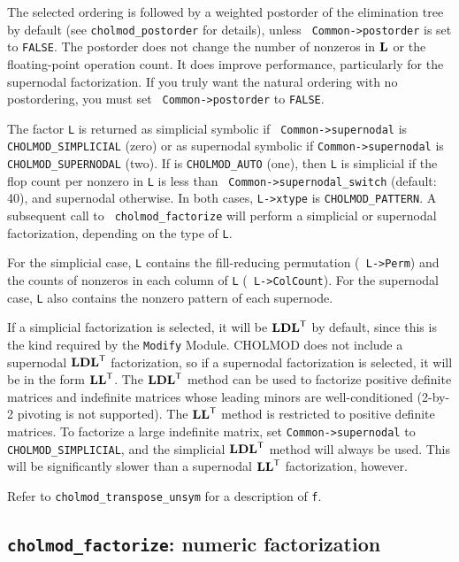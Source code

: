 \documentclass[11pt]{article}
\newcommand{\m}[1]{{\bf{#1}}}       %
\newcommand{\tr}{^{\sf T}}          %
\begin{document}
The selected ordering is followed by a weighted postorder of the elimination
tree by default (see {\tt cholmod\_postorder} for details), unless {\tt
Common->postorder} is set to {\tt FALSE}.  The postorder does not change the
number of nonzeros in $\m{L}$ or the floating-point operation count.  It does
improve performance, particularly for the supernodal factorization.  If you
truly want the natural ordering with no postordering, you must set {\tt
Common->postorder} to {\tt FALSE}.

The factor {\tt L} is returned as simplicial symbolic if {\tt
Common->supernodal} is {\tt CHOLMOD\_SIMPLICIAL} (zero) or as supernodal
symbolic if {\tt Common->supernodal} is {\tt CHOLMOD\_SUPERNODAL} (two).  If
 is {\tt CHOLMOD\_AUTO} (one), then {\tt L} is
simplicial if the flop count per nonzero in {\tt L} is less than {\tt
Common->supernodal\_switch} (default: 40), and supernodal otherwise.  In both
cases, {\tt L->xtype} is {\tt CHOLMOD\_PATTERN}.  A subsequent call to {\tt
cholmod\_factorize} will perform a simplicial or supernodal factorization,
depending on the type of {\tt L}.

For the simplicial case, {\tt L} contains the fill-reducing permutation ({\tt
L->Perm}) and the counts of nonzeros in each column of {\tt L} ({\tt
L->ColCount}).  For the supernodal case, {\tt L} also contains the nonzero
pattern of each supernode.

If a simplicial factorization is selected, it will be $\m{LDL}\tr$ by default,
since this is the kind required by the {\tt Modify} Module.  CHOLMOD does not
include a supernodal $\m{LDL}\tr$ factorization, so if a supernodal
factorization is selected, it will be in the form $\m{LL}\tr$.  The
$\m{LDL}\tr$ method can be used to factorize positive definite matrices and
indefinite matrices whose leading minors are well-conditioned (2-by-2 pivoting
is not supported).  The $\m{LL}\tr$ method is restricted to positive definite
matrices.  To factorize a large indefinite matrix, set {\tt Common->supernodal}
to {\tt CHOLMOD\_SIMPLICIAL}, and the simplicial $\m{LDL}\tr$ method will
always be used.  This will be significantly slower than a supernodal
$\m{LL}\tr$ factorization, however.

Refer to {\tt cholmod\_transpose\_unsym} for a description of {\tt f}.

\subsection{{\tt cholmod\_factorize}: numeric factorization}
\end{document}

